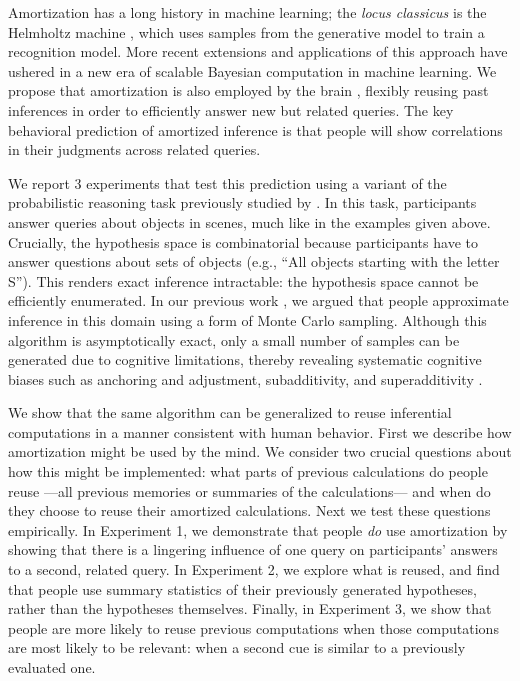 Amortization has a long history in machine learning; the \emph{locus classicus} is the Helmholtz machine \citep{dayan1995helmholtz,hinton1995wake}, which uses samples from the generative model to train a recognition model. More recent extensions and applications of this approach \citep[e.g.,][]{rezende2014stochastic,paige2016inference,kingma2013auto,ritchie2016neurally} have ushered in a new era of scalable Bayesian computation in machine learning. We propose that amortization is also employed by the brain \citep[see][for a related proposal]{yildirim2015efficient}, flexibly reusing past inferences in order to efficiently answer new but related queries. The key behavioral prediction of amortized inference is that people will show correlations in their judgments across related queries. 

We report 3 experiments that test this prediction using a variant of the probabilistic reasoning task previously studied by \citet{dasgupta17}. In this task, participants answer queries about objects in scenes, much like in the examples given above. Crucially, the hypothesis space is combinatorial because participants have to answer questions about sets of objects (e.g., ``All objects starting with the letter S''). This renders exact inference intractable: the hypothesis space cannot be efficiently enumerated. In our previous work \citep{dasgupta17}, we argued that people approximate inference in this domain using a form of Monte Carlo sampling. Although this algorithm is asymptotically exact, only a small number of samples can be generated due to cognitive limitations, thereby revealing systematic cognitive biases such as anchoring and adjustment, subadditivity, and superadditivity \citep[see also][]{lieder2017empirical,lieder2017anchoring,vul2014one}.

We show that the same algorithm can be generalized to reuse inferential computations in a manner consistent with human behavior. First we describe how amortization might be used by the mind. We consider two crucial questions about how this might be implemented: what parts of previous calculations do people reuse ---all previous memories or summaries of the calculations--- and when do they choose to reuse their amortized calculations. Next we test these questions empirically. In Experiment 1, we demonstrate that people \emph{do} use amortization by showing that there is a lingering influence of one query on participants' answers to a second, related query. In Experiment 2, we explore what is reused, and find that people use summary statistics of their previously generated hypotheses, rather than the hypotheses themselves. Finally, in Experiment 3, we show that people are more likely to reuse previous computations when those computations are most likely to be relevant: when a second cue is similar to a previously evaluated one.

